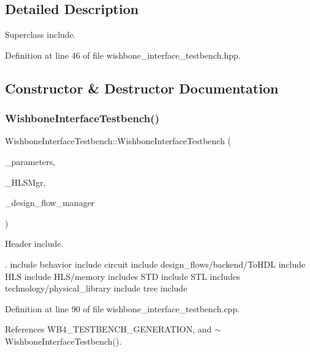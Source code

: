 \subsection{Detailed Description}
Superclass include. 

Definition at line 46 of file wishbone\+\_\+interface\+\_\+testbench.\+hpp.



\subsection{Constructor \& Destructor Documentation}
\mbox{\label{classWishboneInterfaceTestbench_a7c6a2f55225f2d92dfca5d7921dff67e}} 
\subsubsection{\texorpdfstring{Wishbone\+Interface\+Testbench()}{WishboneInterfaceTestbench()}}
{\footnotesize\ttfamily Wishbone\+Interface\+Testbench\+::\+Wishbone\+Interface\+Testbench (\begin{DoxyParamCaption}\item[{const \hyperlink{Parameter_8hpp_a37841774a6fcb479b597fdf8955eb4ea}{Parameter\+Const\+Ref}}]{\+\_\+parameters,  }\item[{const \hyperlink{hls__manager_8hpp_acd3842b8589fe52c08fc0b2fcc813bfe}{H\+L\+S\+\_\+manager\+Ref}}]{\+\_\+\+H\+L\+S\+Mgr,  }\item[{const Design\+Flow\+Manager\+Const\+Ref}]{\+\_\+design\+\_\+flow\+\_\+manager }\end{DoxyParamCaption})}



Header include. 

. include behavior include circuit include design\+\_\+flows/backend/\+To\+H\+DL include H\+LS include H\+L\+S/memory includes S\+TD include S\+TL includes technology/physical\+\_\+library include tree include 

Definition at line 90 of file wishbone\+\_\+interface\+\_\+testbench.\+cpp.



References W\+B4\+\_\+\+T\+E\+S\+T\+B\+E\+N\+C\+H\+\_\+\+G\+E\+N\+E\+R\+A\+T\+I\+ON, and $\sim$\+Wishbone\+Interface\+Testbench().




